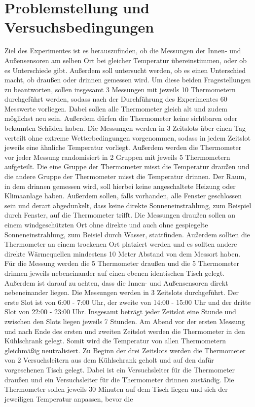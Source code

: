 \documentclass[ ngerman, fontsize= 12pt, paper=a4, headings=big, titlepage=true]{article}
\begin{document}
\section{Problemstellung und Versuchsbedingungen}
Ziel des Experimentes ist es herauszufinden, ob die Messungen der Innen- und Außensensoren am selben Ort bei gleicher Temperatur übereinstimmen, oder ob es Unterschiede gibt. Außerdem soll untersucht werden, ob es einen Unterschied macht, ob draußen oder drinnen gemessen wird.\newline
Um diese beiden Fragestellungen zu beantworten, sollen insgesamt 3 Messungen mit jeweils 10 Thermometern durchgeführt werden, sodass nach der Durchführung des Experimentes 60 Messwerte vorliegen. Dabei sollen alle Thermometer gleich alt und zudem möglichst neu sein. Außerdem dürfen die Thermometer keine sichtbaren oder bekannten Schäden haben. Die Messungen werden in 3 Zeitslots über einen Tag verteilt ohne extreme Wetterbedingungen vorgenommen, sodass in jedem Zeitslot jeweils eine ähnliche Temperatur vorliegt. Außerdem werden die Thermometer vor jeder Messung randomisiert in 2 Gruppen mit jeweils 5 Thermometern aufgeteilt. Die eine Gruppe der Thermometer misst die Temperatur draußen und die andere Gruppe der Thermometer misst die Temperatur drinnen. Der Raum, in dem drinnen gemessen wird, soll hierbei keine angeschaltete Heizung oder Klimaanlage haben. Außerdem sollen, falls vorhanden, alle Fenster geschlossen sein und derart abgedunkelt, dass keine direkte Sonneneinstrahlung, zum Beispiel durch Fenster, auf die Thermometer trifft. \newline
Die Messungen draußen sollen an einem windgeschützten Ort ohne direkte und auch ohne gespiegelte Sonneneinstrahlung, zum Beisiel durch Wasser, stattfinden. Außerdem sollten die Thermometer an einem trockenen Ort platziert werden und es sollten andere direkte Wärmequellen mindestens 10 Meter Abstand von dem Messort haben. \newline
Für die Messung werden die 5 Thermometer draußen und die 5 Thermometer drinnen jeweils nebeneinander auf einen ebenen identischen Tisch gelegt. Außerdem ist darauf zu achten, dass die Innen- und Außensensoren direkt nebeneinander liegen.  \newline
Die Messungen werden in 3 Zeitslots durchgeführt. Der erste Slot ist von 6:00 - 7:00 Uhr, der zweite von 14:00 - 15:00 Uhr und der dritte Slot von 22:00 - 23:00 Uhr. Insgesamt beträgt jeder Zeitslot eine Stunde und zwischen den Slots liegen jeweils 7 Stunden. Am Abend vor der ersten Messung und nach Ende des ersten und zweiten Zeitslot werden die Thermometer  in den Kühlschrank gelegt. Somit wird die Temperatur von allen Thermometern gleichmäßig neutralisiert. Zu Beginn der drei Zeitslots werden die Thermometer von 2 Versuchsleitern aus dem Kühlschrank geholt und auf den dafür vorgesehenen Tisch gelegt. Dabei ist ein Versuchsleiter für die Thermometer draußen und ein Versuchsleiter für die Thermometer drinnen zuständig. Die Thermometer sollen jeweils 30 Minuten auf dem Tisch liegen und sich der jeweiligen Temperatur anpassen, bevor die 
\end{document}
